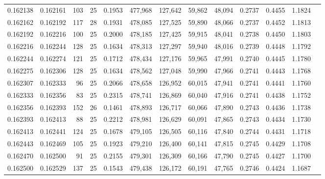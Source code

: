 \begin{tabular}{rrrrrrrrrrrrr}
0.162138 & 0.162161 & 103 &  25 &                                     0.1953 & 477,968 & 127,642 &  59,862 &  48,094 & 0.2737 & 0.4455 & 1.1824 \\
0.162162 & 0.162192 & 117 &  28 &                                     0.1931 & 478,085 & 127,525 &  59,890 &  48,066 & 0.2737 & 0.4452 & 1.1813 \\
0.162192 & 0.162216 & 100 &  25 &                                     0.2000 & 478,185 & 127,425 &  59,915 &  48,041 & 0.2738 & 0.4450 & 1.1803 \\
0.162216 & 0.162244 & 128 &  25 &                                     0.1634 & 478,313 & 127,297 &  59,940 &  48,016 & 0.2739 & 0.4448 & 1.1792 \\
0.162244 & 0.162274 & 121 &  25 &                                     0.1712 & 478,434 & 127,176 &  59,965 &  47,991 & 0.2740 & 0.4445 & 1.1780 \\
0.162275 & 0.162306 & 128 &  25 &                                     0.1634 & 478,562 & 127,048 &  59,990 &  47,966 & 0.2741 & 0.4443 & 1.1768 \\
0.162307 & 0.162333 &  96 &  25 &                                     0.2066 & 478,658 & 126,952 &  60,015 &  47,941 & 0.2741 & 0.4441 & 1.1760 \\
0.162333 & 0.162356 &  83 &  25 &                                     0.2315 & 478,741 & 126,869 &  60,040 &  47,916 & 0.2741 & 0.4438 & 1.1752 \\
0.162356 & 0.162393 & 152 &  26 &                                     0.1461 & 478,893 & 126,717 &  60,066 &  47,890 & 0.2743 & 0.4436 & 1.1738 \\
0.162393 & 0.162413 &  88 &  25 &                                     0.2212 & 478,981 & 126,629 &  60,091 &  47,865 & 0.2743 & 0.4434 & 1.1730 \\
0.162413 & 0.162441 & 124 &  25 &                                     0.1678 & 479,105 & 126,505 &  60,116 &  47,840 & 0.2744 & 0.4431 & 1.1718 \\
0.162443 & 0.162469 & 105 &  25 &                                     0.1923 & 479,210 & 126,400 &  60,141 &  47,815 & 0.2745 & 0.4429 & 1.1708 \\
0.162470 & 0.162500 &  91 &  25 &                                     0.2155 & 479,301 & 126,309 &  60,166 &  47,790 & 0.2745 & 0.4427 & 1.1700 \\
0.162500 & 0.162529 & 137 &  25 &                                     0.1543 & 479,438 & 126,172 &  60,191 &  47,765 & 0.2746 & 0.4424 & 1.1687 \\

\end{tabular}
